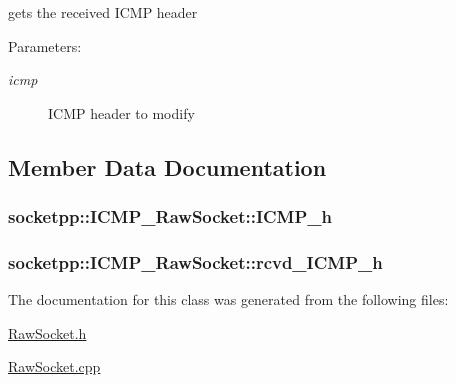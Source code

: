 gets the received ICMP header 

\begin{Desc}
\item[Parameters:]
\begin{description}
\item[{\em icmp}]ICMP header to modify \end{description}
\end{Desc}


\subsection{Member Data Documentation}
\hypertarget{classsocketpp_1_1ICMP__RawSocket_31f1ab3a8beaf8d4cb5b192e644e3f33}{
\subsubsection[{ICMP\_\-h}]{ {\bf socketpp::ICMP\_\-RawSocket::ICMP\_\-h}}}
\label{classsocketpp_1_1ICMP__RawSocket_31f1ab3a8beaf8d4cb5b192e644e3f33}


\hypertarget{classsocketpp_1_1ICMP__RawSocket_1304716643ef2274b8c1c195359110c6}{
\subsubsection[{rcvd\_\-ICMP\_\-h}]{ {\bf socketpp::ICMP\_\-RawSocket::rcvd\_\-ICMP\_\-h}}}
\label{classsocketpp_1_1ICMP__RawSocket_1304716643ef2274b8c1c195359110c6}




The documentation for this class was generated from the following files:\begin{CompactItemize}
\item 
\hyperlink{RawSocket_8h}{RawSocket.h}\item 
\hyperlink{RawSocket_8cpp}{RawSocket.cpp}\end{CompactItemize}
